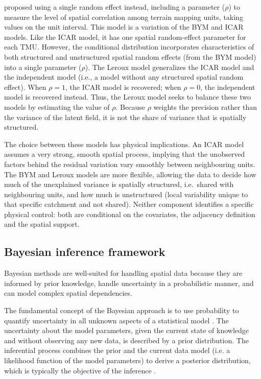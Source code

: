 \documentclass[journal abbreviation, manuscript]{copernicus}
\newcommand{\hlE}[1]{#1}
\begin{document}
\citet{leroux2000estimation} proposed using a single random effect instead, including a parameter ($\rho$) to measure the level of spatial correlation among terrain mapping units, taking values on the unit interval. This model is a variation of the BYM and ICAR models. Like the ICAR model, it has one spatial random-effect parameter for each TMU. However, the conditional distribution incorporates characteristics of both structured and unstructured spatial random effects (from the BYM model) into a single parameter ($\rho$). The Leroux model generalizes the ICAR model and the independent model (i.e., a model without any structured spatial random effect). When $\rho = 1$, the ICAR model is recovered; when $\rho = 0$, the independent model is recovered instead. Thus, the Leroux model seeks to balance these two models by estimating the value of $\rho$. \hlE{Because $\rho$ weights the precision rather than the variance of the latent field, it is not the share of variance that is spatially structured.}

The choice between these models has physical implications. An ICAR model assumes a very strong, smooth spatial process, \hlE{implying that the unobserved factors behind the residual variation vary smoothly between neighbouring units}. The BYM and Leroux models are more flexible, allowing the data to decide how much of the unexplained variance is \hlE{spatially structured, i.e.~shared with neighbouring units,} and how much is \hlE{unstructured} (local variability unique to that specific catchment and not shared). \hlE{Neither component identifies a specific physical control: both are conditional on the covariates, the adjacency definition and the spatial support.}


\subsection{Bayesian inference framework}\label{subsec23}

Bayesian methods are well-suited for handling spatial data because they are informed by prior knowledge, handle uncertainty in a probabilistic manner, and can model complex spatial dependencies.

The fundamental concept of the Bayesian approach is to use probability to quantify uncertainty in all unknown aspects of a statistical model \citep{johnson2022bayes}. The uncertainty about the model parameters, given the current state of knowledge and without observing any new data, is described by a prior distribution. The inferential process combines the prior and the current data model (i.e. a likelihood function of the model parameters) to derive a posterior distribution, which is typically the objective of the inference \citep{congdon2014applied}.
\end{document}
